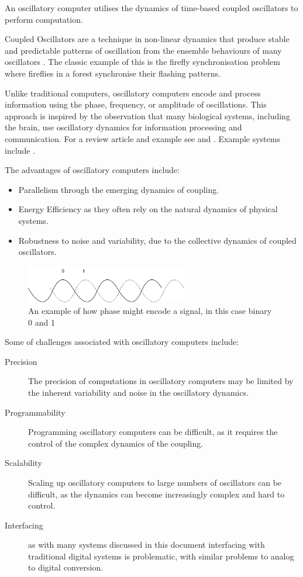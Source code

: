 \documentclass{article}
\begin{document}
An oscillatory computer utilises the dynamics of time-based coupled oscillators to perform computation. 

Coupled Oscillators are a technique in non-linear dynamics that produce stable and predictable patterns of oscillation from the ensemble behaviours of many oscillators \cite{strogatz2001nonlinear}. The classic example of this is the firefly synchronisation problem \cite{buck1988synchronous} where fireflies in a forest synchronise their flashing patterns.

Unlike traditional computers, oscillatory computers encode and process information using the phase, frequency, or amplitude of oscillations. This approach is inspired by the observation that many biological systems, including the brain, use oscillatory dynamics for information processing and communication. For a review article and example see \cite{csaba2020coupled} and \cite{csaba2018perspectives}. Example systems include \cite{ring} \cite{delacour2021oscillatory} \cite{delacour2023mixed} \cite{corti2021networks} \cite{frady2019robust} \cite{maher2024highly}. 

The advantages of oscillatory computers include:

\begin{itemize}
\item Parallelism through the emerging dynamics of coupling.
\item Energy Efficiency as they often rely on the natural dynamics of physical systems.
\item Robustness to noise and variability, due to the collective dynamics of coupled oscillators.
\end{itemize}

\begin{figure}
\centerline{\includegraphics[width=200pt]{figures/oscil.png}}
\caption{An example of how phase might encode a signal, in this case binary 0 and 1}\label{fig:fig2}
\end{figure}

Some of challenges associated with oscillatory computers include:

\begin{description}
\item[Precision] The precision of computations in oscillatory computers may be limited by the inherent variability and noise in the oscillatory dynamics.
\item[Programmability] Programming oscillatory computers can be difficult, as it requires the control of the complex dynamics of the coupling.
\item[Scalability] Scaling up oscillatory computers to large numbers of oscillators can be difficult, as the dynamics can become increasingly complex and hard to control.
\item[Interfacing] as with many systems discussed in this document interfacing with traditional digital systems is problematic, with similar problems to analog to digital conversion. 
\end{description}
\end{document}
